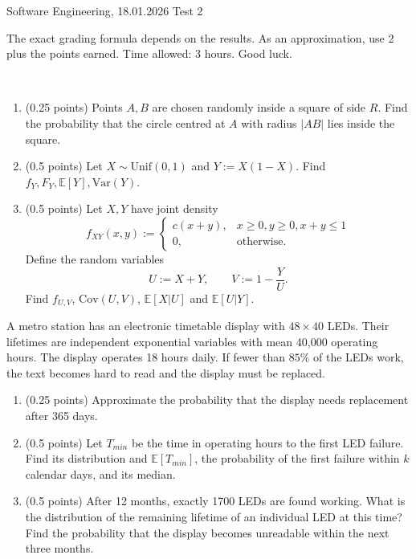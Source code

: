 \documentclass[a4paper]{report}
\begin{document}
\noindent Software Engineering, 18.01.2026 \hfill Test 2

\hrulefill

\begin{it}
The exact grading formula depends on the results. As an approximation, use 2 plus the points earned. Time allowed: 3 hours. Good luck.





\end{it}

\begin{problem}~
\begin{enumerate}
    \item (0.25 points) Points $A,B$ are chosen randomly inside a square of side $R$. Find the probability that the circle centred at $A$ with radius $|AB|$ lies inside the square.
    \item (0.5 points) Let $X\sim\mbox{Unif}(0,1)$ and $Y:=X(1-X)$. Find $f_Y,F_Y,\mathbb E[Y],\mbox{Var}(Y)$.
    \item (0.5 points) Let $X,Y$ have joint density
\[f_{XY}(x,y):=\left\{\begin{array}{cc}
     c(x+y),  & x\geq0, y\geq0, x+y\leq 1 \\
     0, &\mbox{otherwise}.
\end{array}\right. \]
Define the random variables
\[U:=X+Y,\qquad V:=1-\frac{Y}{U}.\]
Find $f_{U,V}$, $\mbox{Cov}(U,V)$, $\mathbb E[X|U]$ and $\mathbb E[U|Y]$.
\end{enumerate}
\end{problem}

\begin{problem}
A metro station has an electronic timetable display with $48\times40$ LEDs. Their lifetimes are independent exponential variables with mean 40,000 operating hours. The display operates 18 hours daily. If fewer than $85\%$ of the LEDs work, the text becomes hard to read and the display must be replaced.
\begin{enumerate}
    \item (0.25 points) Approximate the probability that the display needs replacement after 365 days.
    \item (0.5 points) Let $T_{min}$ be the time in operating hours to the first LED failure. Find its distribution and $\mathbb E[T_{min}]$, the probability of the first failure within $k$ calendar days, and its median.
    \item (0.5 points) After 12 months, exactly 1700 LEDs are found working. What is the distribution of the remaining lifetime of an individual LED at this time? Find the probability that the display becomes unreadable within the next three months.
\end{enumerate}
\end{problem}
\end{document}
